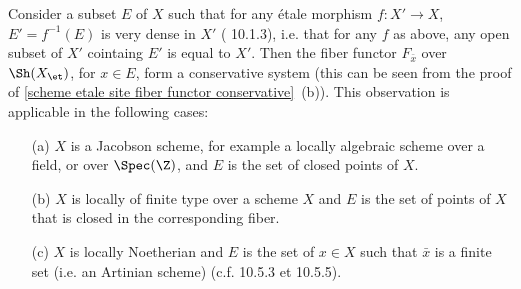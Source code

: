 \begin{remark}
Consider a subset $E$ of $X$ such that for any \'etale morphism $f:X'\to X$, $E'=f^{-1}(E)$ is very dense in $X'$ (\cite{EGA4-3} 10.1.3), i.e. that for any $f$ as above, any open subset of $X'$ cointaing $E'$ is equal to $X'$. Then the fiber functor $F_{\bar{x}}$ over $\Sh(X_\et)$, for $x\in E$, form a conservative system (this can be seen from the proof of \cref{scheme etale site fiber functor conservative}~(b)). This observation is applicable in the following cases:
\begin{enumerate}
    \item[(a)] $X$ is a Jacobson scheme, for example a locally algebraic scheme over a field, or over $\Spec(\Z)$, and $E$ is the set of closed points of $X$.
    \item[(b)] $X$ is locally of finite type over a scheme $X$ and $E$ is the set of points of $X$ that is closed in the corresponding fiber.
    \item[(c)] $X$ is locally Noetherian and $E$ is the set of $x\in X$ such that $\bar{x}$ is a finite set (i.e. an Artinian scheme) (c.f. \cite{EGA4-3} 10.5.3 et 10.5.5).
\end{enumerate} 
\end{remark}

